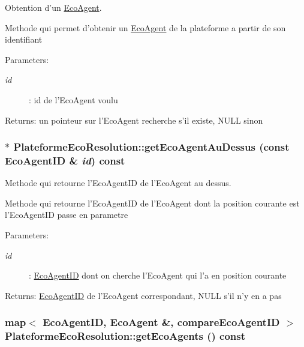 Obtention d'un \hyperlink{classEcoAgent}{EcoAgent}. 

Methode qui permet d'obtenir un \hyperlink{classEcoAgent}{EcoAgent} de la plateforme a partir de son identifiant

\begin{Desc}
\item[Parameters:]
\begin{description}
\item[{\em id}]: id de l'EcoAgent voulu \end{description}
\end{Desc}
\begin{Desc}
\item[Returns:]un pointeur sur l'EcoAgent recherche s'il existe, NULL sinon \end{Desc}
\hypertarget{classPlateformeEcoResolution_a33074c437f57bf9f409502de82b2f58}{
\subsubsection[{getEcoAgentAuDessus}]{ $\ast$ PlateformeEcoResolution::getEcoAgentAuDessus (const {\bf EcoAgentID} \& {\em id}) const}}
\label{classPlateformeEcoResolution_a33074c437f57bf9f409502de82b2f58}


Methode qui retourne l'EcoAgentID de l'EcoAgent au dessus. 

Methode qui retourne l'EcoAgentID de l'EcoAgent dont la position courante est l'EcoAgentID passe en parametre

\begin{Desc}
\item[Parameters:]
\begin{description}
\item[{\em id}]: \hyperlink{classEcoAgentID}{EcoAgentID} dont on cherche l'EcoAgent qui l'a en position courante \end{description}
\end{Desc}
\begin{Desc}
\item[Returns:]\hyperlink{classEcoAgentID}{EcoAgentID} de l'EcoAgent correspondant, NULL s'il n'y en a pas \end{Desc}
\hypertarget{classPlateformeEcoResolution_c3c3307a04fbe2d33c753c2b0eef79af}{
\subsubsection[{getEcoAgents}]{\setlength{\rightskip}{0pt plus 5cm}map$<$ {\bf EcoAgentID}, {\bf EcoAgent} \&, {\bf compareEcoAgentID} $>$ PlateformeEcoResolution::getEcoAgents () const}}
\label{classPlateformeEcoResolution_c3c3307a04fbe2d33c753c2b0eef79af}



